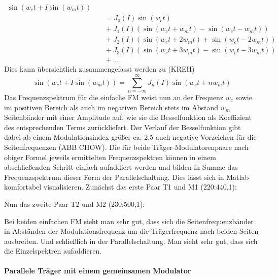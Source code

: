 \begin{equation}
\begin{split}
\sin(w_ct + I\sin(w_mt)) \\ &\quad = J_0(I)\sin(w_ct) \\ &\quad + J_1(I)\left(\sin(w_ct + w_mt) - \sin(w_ct - w_mt)\right) \\ &\quad + J_2(I)\left(\sin(w_ct + 2w_mt)+\sin(w_ct-2w_mt)\right) \\ &\quad  + J_3(I)\left(\sin(w_ct + 3w_mt) - \sin(w_ct - 3w_mt)\right) \\ &\quad  + ...
\end{split}
\end{equation}
Dies kann übersichtlich zusammengefasst werden zu (KREH)
\begin{equation}
\sin(w_ct + I\sin(w_mt)) = \sum_{n=-\infty}^{\infty}J_n(I)\sin(w_ct+nw_mt)
\end{equation}
Das Frequenzspektrum für die einfache FM weist nun an der Frequenz \begin{math} w_c \end{math} sowie im positiven Bereich als auch im negativen Bereich stets im Abstand \begin{math} w_m \end{math} Seitenbänder mit einer Amplitude auf, wie sie die Besselfunktion als Koeffizient des entsprechenden Terms zurückliefert. Der Verlauf der Besselfunktion gibt dabei ab einem Modulationsindex größer ca. 2,5 auch negative Vorzeichen für die Seitenfrequenzen (ABB CHOW). Die für beide Träger-Modulatorenpaare nach obiger Formel jeweils ermittelten Frequenzspektren können in einem abschließenden Schritt einfach aufaddiert werden und bilden in Summe das Frequenzspektrum dieser Form der Parallelschaltung. Dies lässt sich in Matlab komfortabel visualisieren. Zunächst das erste Paar T1 und M1 (220:440,1):

Nun das zweite Paar T2 und M2 (230:500,1):

Bei beiden einfachen FM sieht man sehr gut, dass sich die Seitenfrequenzbänder in Abständen der Modulationsfrequenz um die Trägerfrequenz nach beiden Seiten ausbreiten. Und schließlich in der Parallelschaltung. Man sieht sehr gut, dass sich die Einzelspektren aufaddieren. 


\paragraph{Parallele Träger mit einem gemeinsamen Modulator}$\;$

